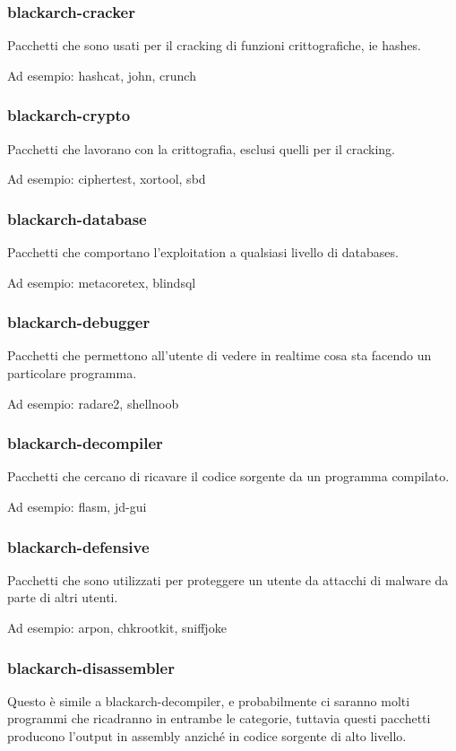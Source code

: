 \documentclass[a4paper, oneside, 11pt]{book}
\begin{document}
\subsubsection{blackarch-cracker}
Pacchetti che sono usati per il cracking di funzioni crittografiche, ie hashes.

Ad esempio: hashcat, john, crunch

\subsubsection{blackarch-crypto}
Pacchetti che lavorano con la crittografia, esclusi quelli per il cracking.

Ad esempio: ciphertest, xortool, sbd

\subsubsection{blackarch-database}
Pacchetti che comportano l'exploitation a qualsiasi livello di databases.

Ad esempio: metacoretex, blindsql

\subsubsection{blackarch-debugger}
Pacchetti che permettono all'utente di vedere in realtime cosa sta facendo un particolare programma.

Ad esempio: radare2, shellnoob

\subsubsection{blackarch-decompiler}
Pacchetti che cercano di ricavare il codice sorgente da un programma compilato.

Ad esempio: flasm, jd-gui

\subsubsection{blackarch-defensive}
Pacchetti che sono utilizzati per proteggere un utente da attacchi di malware da parte di altri utenti.

Ad esempio: arpon, chkrootkit, sniffjoke

\subsubsection{blackarch-disassembler}
Questo è simile a blackarch-decompiler, e probabilmente ci saranno molti programmi che ricadranno in entrambe le categorie, tuttavia questi pacchetti producono l'output in assembly
anziché in codice sorgente di alto livello.
\end{document}
